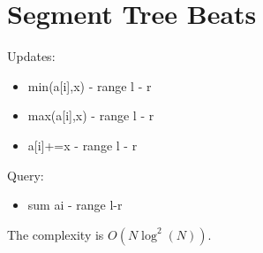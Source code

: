     
    \section{Segment Tree Beats}
    Updates:
    \begin{itemize}
        \item min(a[i],x) - range l - r
        \item max(a[i],x) - range l - r
        \item a[i]+=x - range l - r
    \end{itemize}
    Query:
    \begin{itemize}
        \item sum ai - range l-r
    \end{itemize}

    The complexity is $O(N\log^2(N))$.
